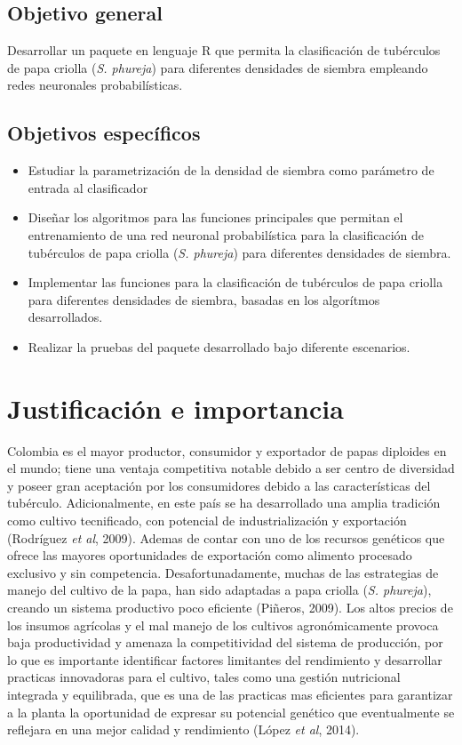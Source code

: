 \subsection{Objetivo general}

Desarrollar un paquete en lenguaje R que permita la clasificación de tubérculos de papa criolla (\textit{S. phureja}) para diferentes densidades de siembra empleando redes neuronales probabilísticas.

\subsection{Objetivos espec\'ificos}
 
\begin{itemize}
\item{Estudiar la parametrizaci\'on de la densidad de siembra como par\'ametro de entrada al clasificador}
\item{Diseñar los algoritmos para las funciones principales que permitan el entrenamiento de una red neuronal probabilística para la clasificación de tubérculos de papa criolla (\textit{S. phureja}) para diferentes densidades de siembra.}
\item{Implementar las funciones  para la clasificación de tubérculos de papa criolla para diferentes densidades de siembra, basadas en los algorítmos desarrollados.}
\item{Realizar la pruebas del paquete desarrollado bajo diferente escenarios.}
\end{itemize}

\section{Justificación e importancia}

Colombia es el mayor productor, consumidor y exportador de papas diploides en el mundo; tiene una ventaja competitiva notable debido a ser centro de diversidad y poseer gran aceptación por los consumidores debido a las características del tubérculo. Adicionalmente, en este país se ha desarrollado una amplia tradición como cultivo tecnificado, con potencial de industrialización y exportación (Rodríguez \textit{et al}, 2009). Ademas de contar con uno de los recursos genéticos que ofrece las mayores oportunidades de exportación como alimento procesado exclusivo y sin competencia. Desafortunadamente, muchas de las estrategias de manejo del cultivo de la papa, han sido adaptadas a papa criolla (\textit{S. phureja}), creando un sistema productivo poco eficiente (Piñeros, 2009). Los altos precios de los insumos agrícolas y el mal manejo de los cultivos agronómicamente provoca  baja productividad y amenaza la competitividad del sistema de producción, por lo que es importante identificar factores limitantes del rendimiento y desarrollar practicas innovadoras para el cultivo, tales como una gestión nutricional integrada y equilibrada, que es una de las practicas mas eficientes para garantizar a la planta la oportunidad de expresar su potencial genético que eventualmente se reflejara en una mejor calidad y rendimiento (López \textit{et al}, 2014).\\
 
